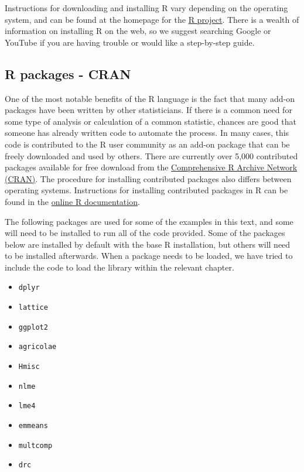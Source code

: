 \documentclass[letterpaper,]{book}
\providecommand{\tightlist}{%
  \setlength{\itemsep}{0pt}\setlength{\parskip}{0pt}}
\begin{document}
Instructions for downloading and installing R vary depending on the operating system, and can be found at the homepage for the \href{http://www.r-project.org/}{R project}. There is a wealth of information on installing R on the web, so we suggest searching Google or YouTube if you are having trouble or would like a step-by-step guide.

\hypertarget{cran}{%
\subsection{R packages - CRAN}\label{cran}}

One of the most notable benefits of the R language is the fact that many add-on packages have been written by other statisticians. If there is a common need for some type of analysis or calculation of a common statistic, chances are good that someone has already written code to automate the process. In many cases, this code is contributed to the R user community as an add-on package that can be freely downloaded and used by others. There are currently over 5,000 contributed packages available for free download from the \href{http://cran.r-project.org/web/packages/}{Comprehensive R Archive Network (CRAN)}. The procedure for installing contributed packages also differs between operating systems. Instructions for installing contributed packages in R can be found in the \href{http://cran.r-project.org/doc/manuals/R-admin.html\#Installing-packages}{online R documentation}.

The following packages are used for some of the examples in this text, and some will need to be installed to run all of the code provided. Some of the packages below are installed by default with the base R installation, but others will need to be installed afterwards. When a package needs to be loaded, we have tried to include the code to load the library within the relevant chapter.

\begin{itemize}
\tightlist
\item
  \texttt{dplyr}
\item
  \texttt{lattice}
\item
  \texttt{ggplot2}
\item
  \texttt{agricolae}
\item
  \texttt{Hmisc}
\item
  \texttt{nlme}
\item
  \texttt{lme4}
\item
  \texttt{emmeans}
\item
  \texttt{multcomp}
\item
  \texttt{drc}
\end{itemize}
\end{document}

